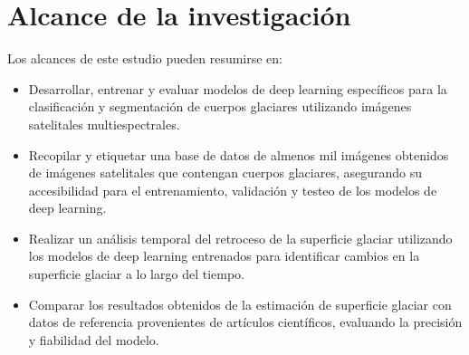 \section{Alcance de la investigación}
Los alcances de este estudio pueden resumirse en:
\begin{itemize}
	\item Desarrollar, entrenar y evaluar modelos de deep learning específicos para la clasificación y segmentación de cuerpos glaciares utilizando imágenes satelitales multiespectrales.
	\item Recopilar y etiquetar una base de datos de almenos mil imágenes obtenidos de imágenes satelitales que contengan cuerpos glaciares, asegurando su accesibilidad para el entrenamiento, validación y testeo de los modelos de deep learning.
	\item Realizar un análisis temporal del retroceso de la superficie glaciar utilizando los modelos de deep learning entrenados para identificar cambios en la superficie glaciar a lo largo del tiempo.
	\item Comparar los resultados obtenidos de la estimación de superficie glaciar con datos de referencia provenientes de artículos científicos, evaluando la precisión y fiabilidad del modelo.
	
\end{itemize}

